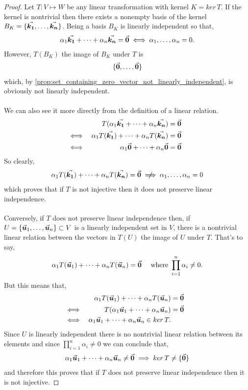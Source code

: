 \documentclass[MathsNotesBase.tex]{subfiles}
\begin{document}
{		\medskip
		\begin{proof}
			Let ${ T: V \longmapsto W }$ be any linear transformation with kernel ${ K = ker\,T }$. If the kernel is nontrivial then there exists a nonempty basis of the kernel ${ B_K = \{ \vec{\bm{k_1}}, \dots, \vec{\bm{k_n}} \} }$. Being a basis $B_K$ is linearly independent so that,
			\[ \alpha_1\vec{\bm{k_1}} + \cdots + \alpha_n\vec{\bm{k_n}} = \vec{\bm{0}} \iff \alpha_1,\dots,\alpha_n = 0. \]
			However, $T(B_K)$ the image of $B_K$ under $T$ is
			\[ \{ \vec{\bm{0}}, \dots, \vec{\bm{0}} \} \]
			which, by \autoref{prop:set_containing_zero_vector_not_linearly_independent}, is obviously not linearly independent.\\\\
			We can also see it more directly from the definition of a linear relation.
			\begin{align*}
			&& T(\alpha_1\vec{\bm{k_1}} + \cdots + \alpha_n\vec{\bm{k_n}}) &= \vec{\bm{0}} \\
			&\iff & \alpha_1T(\vec{\bm{k_1}}) + \cdots + \alpha_nT(\vec{\bm{k_n}}) &= \vec{\bm{0}}  &\text{\scriptsize{}} \\
			&\iff & \alpha_1\vec{\bm{0}} + \cdots + \alpha_n\vec{\bm{0}} &= \vec{\bm{0}}  &\text{\scriptsize{}}
			\end{align*}
			So clearly,
			\[ \alpha_1T(\V{k_1}) + \cdots + \alpha_nT(\V{k_n}) = \0 \centernot\implies \alpha_1,\dots,\alpha_n = 0 \]
			which proves that if $T$ is not injective then it does not preserve linear independence.\\\\
			Conversely, if $T$ does not preserve linear independence then, if ${ U = \{ \vec{\bm{u}}_1,\dots,\vec{\bm{u}}_n \} \subset V }$ is a linearly independent set in $V$, there is a nontrivial linear relation between the vectors in $T(U)$ the image of $U$ under $T$. That's to say,
			\[ \alpha_1T(\vec{\bm{u}}_1) + \cdots + \alpha_nT(\vec{\bm{u}}_n) = \vec{\bm{0}}  \hspace{10pt}\text{ where } \prod_{i=1}^{n}\alpha_i \neq 0. \]
			But this means that,
			\begin{align*}
			&& \alpha_1T(\vec{\bm{u}}_1) + \cdots + \alpha_nT(\vec{\bm{u}}_n) &= \vec{\bm{0}} \\
			&\iff & T(\alpha_1\vec{\bm{u}}_1 + \cdots + \alpha_n\vec{\bm{u}}_n) &= \vec{\bm{0}} &\text{\scriptsize{}} \\
			&\iff & \alpha_1\vec{\bm{u}}_1 + \cdots + \alpha_n\vec{\bm{u}}_n \in ker\,T. &\text{\scriptsize{}}
			\end{align*}
			Since $U$ is linearly independent there is no nontrivial linear relation between its elements and since ${ \prod_{i=1}^{n}\alpha_i \neq 0 }$ we can conclude that,
			\[ \alpha_1\vec{\bm{u}}_1 + \cdots + \alpha_n\vec{\bm{u}}_n \neq \vec{\bm{0}} \implies ker\,T \neq \{\vec{\bm{0}}\} \]
			and therefore this proves that if $T$ does not preserve linear independence then it is not injective.
		\end{proof}
		
}
\end{document}
